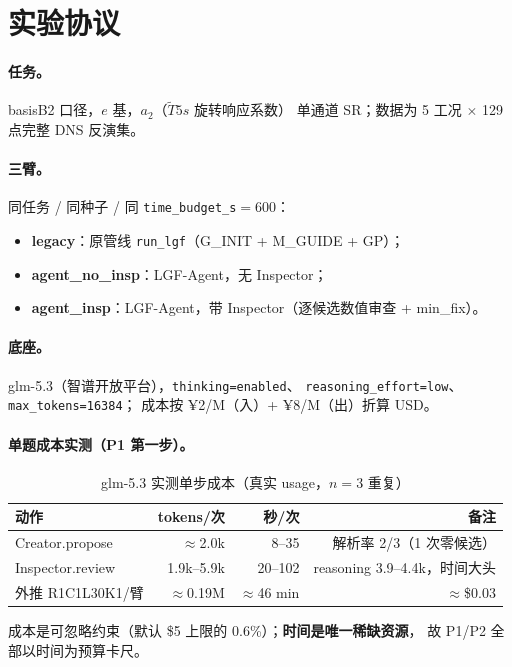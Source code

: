 \documentclass[11pt,a4paper]{ctexart}
\begin{document}
\section{实验协议}

\paragraph{任务。}basisB2 口径，$e$ 基，$a_2$（$\tilde T5s$ 旋转响应系数）
单通道 SR；数据为 5 工况 $\times$ 129 点完整 DNS 反演集。

\paragraph{三臂。}同任务 / 同种子 / 同 \texttt{time\_budget\_s}$=600$：
\begin{itemize}\itemsep2pt
  \item \textbf{legacy}：原管线 \texttt{run\_lgf}（G\_INIT + M\_GUIDE + GP）；
  \item \textbf{agent\_no\_insp}：LGF-Agent，无 Inspector；
  \item \textbf{agent\_insp}：LGF-Agent，带 Inspector（逐候选数值审查 + min\_fix）。
\end{itemize}

\paragraph{底座。}glm-5.3（智谱开放平台），\texttt{thinking=enabled}、
\texttt{reasoning\_effort=low}、\texttt{max\_tokens=16384}；
成本按 ¥2/M（入）+ ¥8/M（出）折算 USD。

\paragraph{单题成本实测（P1 第一步）。}
\begin{table}[htbp]\centering\small
\caption{glm-5.3 实测单步成本（真实 usage，$n{=}3$ 重复）}
\begin{tabular}{@{}lrrr@{}}
\toprule
动作 & tokens/次 & 秒/次 & 备注 \\
\midrule
Creator.propose & $\approx$2.0k & 8--35 & 解析率 2/3（1 次零候选） \\
Inspector.review & 1.9k--5.9k & 20--102 & reasoning 3.9--4.4k，时间大头 \\
\midrule
外推 R1C1L30K1/臂 & $\approx$0.19M & $\approx$46 min & $\approx$\$0.03 \\
\bottomrule
\end{tabular}
\end{table}
成本是可忽略约束（默认 \$5 上限的 0.6\%）；\textbf{时间是唯一稀缺资源}，
故 P1/P2 全部以时间为预算卡尺。
\end{document}
